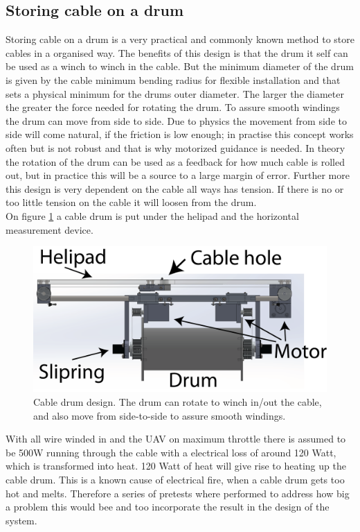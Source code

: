 \subsection{Storing cable on a drum}
Storing cable on a drum is a very practical and commonly known method to store cables in a organised way. The benefits of this design is that the drum it self can be used as a winch to winch in the cable. But the minimum diameter of the drum is given by the cable minimum bending radius for flexible installation and that sets a physical minimum for the drums outer diameter. The larger the diameter the greater the force needed for rotating the drum. To assure smooth windings the drum can move from side to side. Due to physics the movement from side to side will come natural, if the friction is low enough; in practise this concept works often but is not robust and that is why motorized guidance is needed. In theory the rotation of the drum can be used as a feedback for how much cable is rolled out, but in practice this will be a source to a large margin of error. Further more this design is very dependent on the cable all ways has tension. If there is no or too little tension on the cable it will loosen from the drum. \\
On figure \ref{fig:cable-drum} a cable drum is put under the helipad and the horizontal measurement device. 

\begin{figure}[H]
\centering
\includegraphics[scale=0.75]{graphics/cad/cable-drum.png}
\caption[Cable drum design]{Cable drum design. The drum can rotate to winch in/out the cable, and also move from side-to-side to assure smooth windings.}
\label{fig:cable-drum}
\end{figure}

\noindent
With all wire winded in and the UAV on maximum throttle there is assumed to be 500W running through the cable with a electrical loss of around 120 Watt, which is transformed into heat. 120 Watt of heat will give rise to heating up the cable drum. This is a known cause of electrical fire, when a cable drum gets too hot and melts. Therefore a series of pretests where performed to address how big a problem this would bee and too incorporate the result in the design of the system. 

